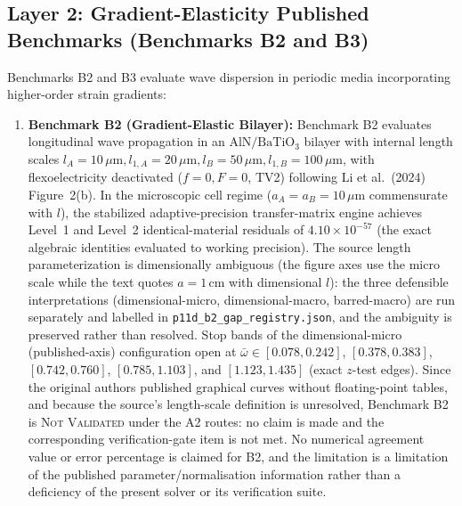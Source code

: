 \subsection{Layer 2: Gradient-Elasticity Published Benchmarks (Benchmarks B2 and B3)}
\label{sec:published_benchmarks}
Benchmarks B2 and B3 evaluate wave dispersion in periodic media incorporating higher-order strain gradients:
\begin{enumerate}
  \item \textbf{Benchmark B2 (Gradient-Elastic Bilayer):} Benchmark B2 evaluates longitudinal wave propagation in an $\mathrm{AlN}/\mathrm{BaTiO_3}$ bilayer with internal length scales $l_A = 10\,\mu\mathrm{m}, l_{1,A} = 20\,\mu\mathrm{m}, l_B = 50\,\mu\mathrm{m}, l_{1,B} = 100\,\mu\mathrm{m}$, with flexoelectricity deactivated ($f = 0, F = 0$, TV2) following Li et al.\ (2024) \cite{li2024anchorB} Figure~2(b). In the microscopic cell regime ($a_A = a_B = 10\,\mu\mathrm{m}$ commensurate with $l$), the stabilized adaptive-precision transfer-matrix engine achieves Level~1 and Level~2 identical-material residuals of $4.10 \times 10^{-57}$ (the exact algebraic identities evaluated to working precision). The source length parameterization is dimensionally ambiguous (the figure axes use the micro scale while the text quotes $a = 1\,\mathrm{cm}$ with dimensional $l$): the three defensible interpretations (dimensional-micro, dimensional-macro, barred-macro) are run separately and labelled in \texttt{p11d\_b2\_gap\_registry.json}, and the ambiguity is preserved rather than resolved. Stop bands of the dimensional-micro (published-axis) configuration open at $\bar{\omega} \in [0.078, 0.242]$, $[0.378, 0.383]$, $[0.742, 0.760]$, $[0.785, 1.103]$, and $[1.123, 1.435]$ (exact $z$-test edges). Since the original authors published graphical curves without floating-point tables, and because the source's length-scale definition is unresolved, Benchmark B2 is \textsc{Not Validated} under the A2 routes: no claim is made and the corresponding verification-gate item is not met. No numerical agreement value or error percentage is claimed for B2, and the limitation is a limitation of the published parameter/normalisation information rather than a deficiency of the present solver or its verification suite.

\end{enumerate}
